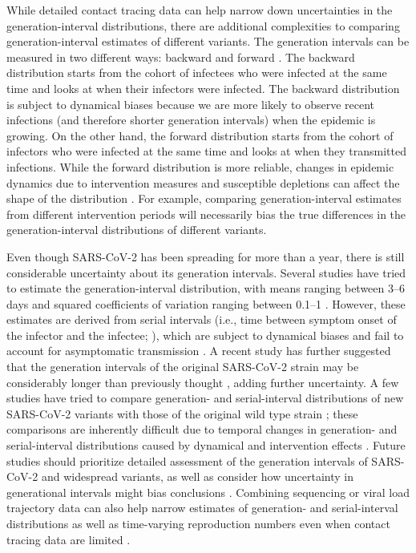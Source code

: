 \documentclass[12pt]{article}
\begin{document}
While detailed contact tracing data can help narrow down uncertainties in the generation-interval distributions, there are additional complexities to comparing generation-interval estimates of different variants.
The generation intervals can be measured in two different ways: backward and forward \citep{champredon2015intrinsic}.
The backward distribution starts from the cohort of infectees who were infected at the same time and looks at when their infectors were infected. 
The backward distribution is subject to dynamical biases because we are more likely to observe recent infections (and therefore shorter generation intervals) when the epidemic is growing.
On the other hand, the forward distribution starts from the cohort of infectors who were infected at the same time and looks at when they transmitted infections.
While the forward distribution is more reliable, changes in epidemic dynamics due to intervention measures and susceptible depletions can affect the shape of the distribution \citep{ali2020serial, nishiura2010time}.
For example, comparing generation-interval estimates from different intervention periods will necessarily bias the true differences in the generation-interval distributions of different variants.

Even though SARS-CoV-2 has been spreading for more than a year, there is still considerable uncertainty about its generation intervals.
Several studies have tried to estimate the generation-interval distribution, with means ranging between 3--6 days and squared coefficients of variation ranging between 0.1--1 \citep{ferretti2020quantifying,Ferretti2020timing,ganyani2020estimating,knight2020estimating}.
However, these estimates are derived from serial intervals (i.e., time between symptom onset of the infector and the infectee; \cite{svensson2007note}), which are subject to dynamical biases \citep{park2021forward} and fail to account for asymptomatic transmission \citep{park2020time}.
A recent study has further suggested that the generation intervals of the original SARS-CoV-2 strain may be considerably longer than previously thought \citep{sender2021unmitigated}, adding further uncertainty.
A few studies have tried to compare generation- and serial-interval distributions of new SARS-CoV-2 variants with those of the original wild type strain \citep{pung2021serial, hart2021generation};
these comparisons are inherently difficult due to temporal changes in generation- and serial-interval distributions caused by dynamical and intervention effects \citep{ali2020serial,park2021forward}.
Future studies should prioritize detailed assessment of the generation intervals of SARS-CoV-2 and widespread variants, as well as consider how uncertainty in generational intervals might bias conclusions \citep{doi:10.1098/rsif.2020.0144,ali2020serial,gostic2020practical}.
Combining sequencing or viral load trajectory data can also help narrow estimates of generation- and serial-interval distributions as well as time-varying reproduction numbers even when contact tracing data are limited \citep{lin2020viral,Stockdale2022.02.23.22271355}.
\end{document}

